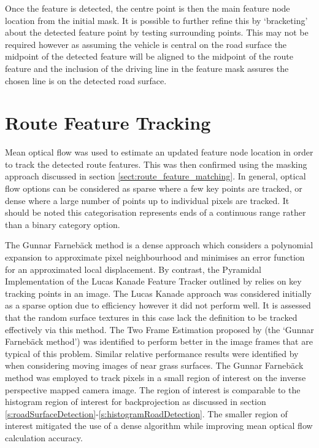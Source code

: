 \documentclass[]{aiaa-tc}%
\begin{document}
Once the feature is detected, the centre point is then the main feature node location from the initial mask. It is possible to further refine this by `bracketing' about the detected feature point by testing surrounding points. This may not be required however as assuming the vehicle is central on the road surface the midpoint of the detected feature will be aligned to the midpoint of the route feature and the inclusion of the driving line in the feature mask assures the chosen line is on the detected road surface.

\section{Route Feature Tracking}\label{s:roadFeatureTracking}

Mean optical flow was used to estimate an updated feature node location in order to track the detected route features. This was then confirmed using the masking approach discussed in section \ref{sect:route_feature_matching}. In general, optical flow options can be considered as sparse where a few key points are tracked, or dense where a large number of points up to individual pixels are tracked. It should be noted this categorisation represents ends of a continuous range rather than a binary category option. 

The Gunnar Farneb{\"a}ck method \citep{opticalFlowSolution} is a dense approach which considers a polynomial expansion to approximate pixel neighbourhood and minimises an error function for an approximated local displacement. By contrast, the Pyramidal Implementation of the Lucas Kanade Feature Tracker outlined by \citet{opticalFlowLKPyramidal} relies on key tracking points in an image. The Lucas Kanade approach was considered initially as a sparse option due to efficiency however it did not perform well. It is assessed that the random surface textures in this case lack the definition to be tracked effectively via this method. The Two Frame Estimation proposed by \citet{opticalFlowSolution} (the `Gunnar Farneb{\"a}ck method') was identified to perform better in the image frames that are typical of this problem. Similar relative performance results were identified by \citet{opticalFlowLKvsDenseUAV} when considering moving images of near grass surfaces. The Gunnar Farneb{\"a}ck method was employed to track pixels in a small region of interest on the inverse perspective mapped camera image. The region of interest is comparable to the histogram region of interest for backprojection as discussed in section \ref{s:roadSurfaceDetection}-\ref{s:histogramRoadDetection}. The smaller region of interest mitigated the use of a dense algorithm while improving mean optical flow calculation accuracy.
\end{document}
